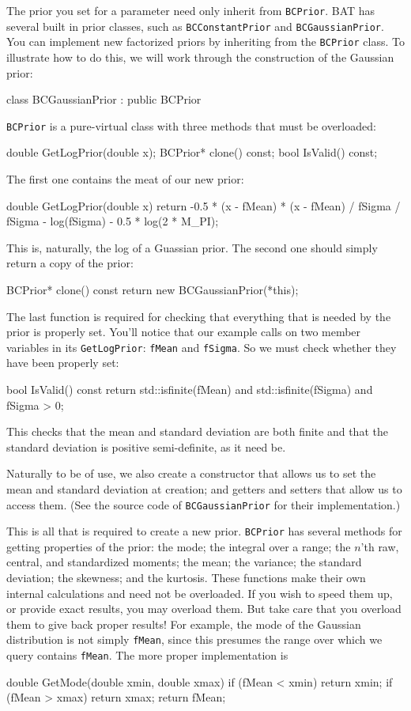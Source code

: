 \documentclass[
10pt,
a4paper,
bibliography=totoc,
captions=nooneline, %
numbers=noenddot,
twoside]{scrbook}
\newcommand{\code}[1]{\texttt{#1}}
\begin{document}
The prior you set for a parameter need only inherit from
\code{BCPrior}. BAT has several built in prior classes, such as
\code{BCConstantPrior} and \code{BCGaussianPrior}.  You can implement
new factorized priors by inheriting from the \code{BCPrior} class. To
illustrate how to do this, we will work through the construction of
the Gaussian prior:
\begin{cxxcode}
class BCGaussianPrior : public BCPrior
\end{cxxcode}
\code{BCPrior} is a pure-virtual class with three methods that must be overloaded:
\begin{cxxcode}
double GetLogPrior(double x);
BCPrior* clone() const;
bool IsValid() const;
\end{cxxcode}
The first one contains the meat of our new prior:
\begin{cxxcode}
double GetLogPrior(double x)
{
  return -0.5 * (x - fMean) * (x - fMean) / fSigma / fSigma - log(fSigma) - 0.5 * log(2 * M_PI);
}
\end{cxxcode}
This is, naturally, the log of a Guassian prior. The second one should
simply return a copy of the prior:
\begin{cxxcode}
BCPrior* clone() const
{
  return new BCGaussianPrior(*this);
}
\end{cxxcode}
The last function is required for checking that everything that is
needed by the prior is properly set. You'll notice that our example
calls on two member variables in its \code{GetLogPrior}: \code{fMean}
and \code{fSigma}. So we must check whether they have been properly set:
\begin{cxxcode}
bool IsValid() const
{
  return std::isfinite(fMean) and std::isfinite(fSigma) and fSigma > 0;
}
\end{cxxcode}
This checks that the mean and standard deviation are both finite and
that the standard deviation is positive semi-definite, as it need be.

Naturally to be of use, we also create a constructor that allows us to
set the mean and standard deviation at creation; and getters and
setters that allow us to access them. (See the source code of
\code{BCGaussianPrior} for their implementation.)

This is all that is required to create a new prior. \code{BCPrior} has
several methods for getting properties of the prior: the mode; the
integral over a range; the $n$'th raw, central, and standardized
moments; the mean; the variance; the standard deviation; the skewness;
and the kurtosis. These functions make their own internal calculations
and need not be overloaded. If you wish to speed them up, or provide
exact results, you may overload them. But take care that you overload
them to give back proper results! For example, the mode of the
Gaussian distribution is not simply \code{fMean}, since this presumes
the range over which we query contains \code{fMean}. The more proper
implementation is
\begin{cxxcode}
double GetMode(double xmin, double xmax)
{
  if (fMean < xmin)
    return xmin;
  if (fMean > xmax)
    return xmax;
  return fMean;
}
\end{cxxcode}
\end{document}

